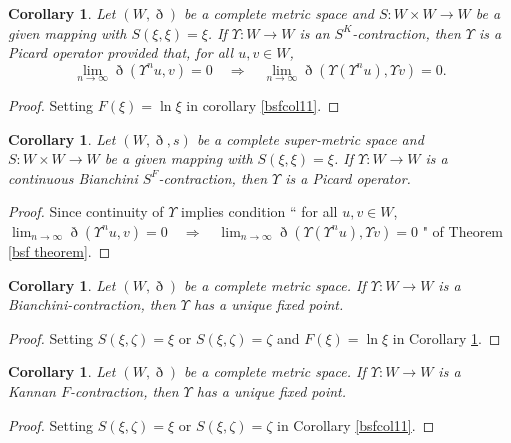 \documentclass[pdflatex,sn-mathphys-num]{sn-jnl}%
\theoremstyle{thmstyleone}%
\theoremstyle{thmstyletwo}%
\newtheorem{corollary}[theorem]{Corollary}
\theoremstyle{thmstylethree}%
\begin{document}
    \begin{corollary}\label{bsfcol1}\cite{bessem}
         Let $(W,\eth)$ be a complete metric space and $S:W\times W \to W$ be a given mapping  with $S(\xi,\xi)=\xi$. 
If $\Upsilon  : W \to W$ is an \textit{$S^K$-contraction}, then $\Upsilon $ is a \textit{Picard operator} provided that, for all $u,v \in W$,
\[
\lim_{n \to \infty} \eth(\Upsilon^n u, v) = 0 
\quad \Longrightarrow \quad 
\lim_{n \to \infty} \eth(\Upsilon(\Upsilon^n u), \Upsilon  v) = 0.
\]
\end{corollary}
\begin{proof}
     Setting $F(\xi)=\ln \xi $ in corollary \ref{bsfcol11}.
\end{proof}
   \begin{corollary}\label{bsfcol2}
         Let $(W,\eth,s)$ be a complete super-metric space and $S:W\times W \to W$ be a given mapping  with $S(\xi,\xi)=\xi$. 
If $\Upsilon  : W \to W$ is a continuous \textit{Bianchini $S^F$-contraction}, then $\Upsilon $ is a \textit{Picard operator}.
\end{corollary}
\begin{proof}
    Since continuity of $\Upsilon $ implies condition “ for all $u,v \in W$, $\lim_{n \to \infty} \eth(\Upsilon^n u, v) = 0 
\quad \Longrightarrow \quad 
\lim_{n \to \infty} \eth(\Upsilon(\Upsilon^n u), \Upsilon  v) = 0$
" of Theorem \ref{bsf theorem}.
\end{proof}
\begin{corollary}\cite{bianchini}
     Let $(W,\eth)$ be a complete metric space. If $\Upsilon :W\to W$ is a Bianchini-contraction, then $\Upsilon $ has a unique fixed point.
\end{corollary}
\begin{proof}
    Setting $S(\xi,\zeta)=\xi$ or $S(\xi,\zeta)=\zeta $ and $F(\xi)=\ln \xi $ in Corollary \ref{bsfcol2}.
\end{proof}
\begin{corollary}\cite{batra}
     Let $(W,\eth)$ be a complete metric space. If $\Upsilon :W\to W$ is a \textit{Kannan $F$-contraction}, then $\Upsilon $ has a unique fixed point.
\end{corollary}
\begin{proof}
    Setting $S(\xi,\zeta)=\xi$ or $S(\xi,\zeta)=\zeta $ in Corollary \ref{bsfcol11}.
\end{proof}


\end{document}
